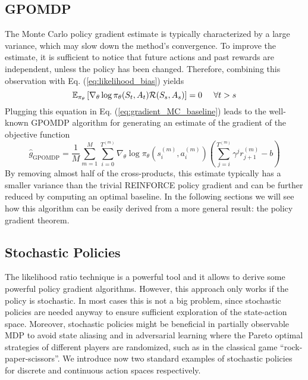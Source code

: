 \subsection{GPOMDP}
The Monte Carlo policy gradient estimate is typically characterized by a large variance, which may slow down the method's convergence. To improve the estimate, it is sufficient to notice that future actions and past rewards are independent, unless the policy has been changed. Therefore, combining this observation with Eq. (\ref{eq:likelihood_bias}) yields
\begin{equation*}
	\E[\pi_\theta]{\nabla_\theta\log \pi_\theta(S_t, A_t) \calR(S_s, A_s)} = 0
	\;\;\;\;\; \forall t>s
\end{equation*}
Plugging this equation in Eq. (\ref{eq:gradient_MC_baseline}) leads to the well-known \gls{GPOMDP} algorithm \cite{baxter2001infinite} for generating an estimate of the gradient of
the objective function
\begin{equation}
\label{eq:GPOMDP}
	\widehat{g}_{\text{GPOMDP}} = \frac{1}{M} \sum^{M}_{m=1} \sum_{i=0}^{T^{(m)}} 
	\nabla_\theta \log \pi_\theta(s_i^{(m)}, a_i^{(m)}) \left( 
	\sum^{T^{(m)}}_{j=i} \gamma^j r_{j+1}^{(m)} - b \right)
\end{equation}
By removing almost half of the cross-products, this estimate typically has a smaller variance than the trivial REINFORCE policy gradient and can be further reduced by computing an optimal baseline. In the following sections we will see how this algorithm can be easily derived from a more general result: the policy gradient theorem. 

\subsection{Stochastic Policies}
The likelihood ratio technique is a powerful tool and it allows to derive some powerful policy gradient algorithms. However, this approach only works if the policy is  stochastic. In most cases this is not a big problem, since stochastic policies are needed anyway to ensure sufficient exploration of the state-action space. Moreover, stochastic policies might be beneficial in partially observable \gls{MDP} to avoid state aliasing and in adversarial learning where the Pareto optimal strategies of different players are randomized, such as in the classical game ``rock-paper-scissors''. We introduce now two standard examples of stochastic policies for discrete and continuous action spaces respectively.  

